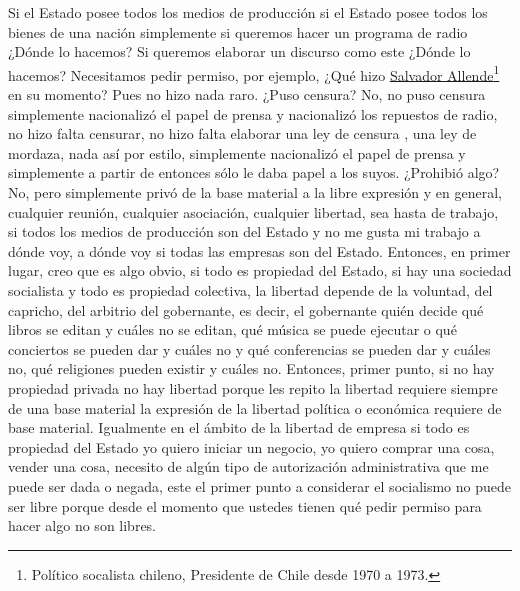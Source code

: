 Si el Estado posee todos los medios de producción si el Estado posee todos los bienes de una nación simplemente si queremos hacer un programa de radio ¿Dónde lo hacemos? Si queremos elaborar un discurso como este ¿Dónde lo hacemos? Necesitamos pedir permiso, por ejemplo, ¿Qué hizo \href{https://en.wikipedia.org/wiki/Salvador_Allende}{Salvador Allende}\footnote{Político socalista chileno, Presidente de Chile desde 1970 a 1973.} en su momento? Pues no hizo nada raro. ¿Puso censura? No, no puso censura simplemente nacionalizó el papel de prensa y nacionalizó los repuestos de radio, no hizo falta censurar, no hizo falta elaborar una ley de censura , una ley de mordaza, nada así por estilo, simplemente nacionalizó el papel de prensa y simplemente a partir de entonces sólo le daba papel a los suyos. ¿Prohibió algo? No, pero simplemente privó de la base material a la libre expresión y en general, cualquier reunión, cualquier asociación, cualquier libertad, sea hasta de trabajo, si todos los medios de producción son del Estado y no me gusta mi trabajo a dónde voy, a dónde voy si todas las empresas son del Estado. Entonces, en primer lugar, creo que es algo obvio, si todo es propiedad del Estado, si hay una sociedad socialista y todo es propiedad colectiva, la libertad depende de la voluntad, del capricho, del arbitrio del gobernante, es decir, el gobernante quién decide qué libros se editan y cuáles no se editan, qué música se puede ejecutar o qué conciertos se pueden dar y cuáles no y qué conferencias se pueden dar y cuáles no, qué religiones pueden existir y cuáles no. Entonces, primer punto, si no hay propiedad privada no hay libertad porque les repito la libertad requiere siempre de una base material la expresión de la libertad política o económica requiere de base material. Igualmente en el ámbito de la libertad de empresa si todo es propiedad del Estado yo quiero iniciar un negocio, yo quiero comprar una cosa, vender una cosa, necesito de algún tipo de autorización administrativa que me puede ser dada o negada, este el primer punto a considerar el socialismo no puede ser libre porque desde el momento que ustedes tienen qué pedir permiso para hacer algo no son libres.

